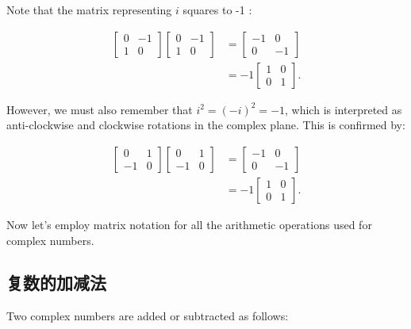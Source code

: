 Note that the matrix representing $i$ squares to -1 :

$$
\begin{aligned}
{\left[\begin{array}{cc}
0 & -1 \\
1 & 0
\end{array}\right]\left[\begin{array}{cc}
0 & -1 \\
1 & 0
\end{array}\right] } & =\left[\begin{array}{cc}
-1 & 0 \\
0 & -1
\end{array}\right] \\
& =-1\left[\begin{array}{ll}
1 & 0 \\
0 & 1
\end{array}\right] .
\end{aligned}
$$

However, we must also remember that $i^{2}=(-i)^{2}=-1$, which is interpreted as anti-clockwise and clockwise rotations in the complex plane. This is confirmed by:

$$
\begin{aligned}
{\left[\begin{array}{cc}
0 & 1 \\
-1 & 0
\end{array}\right]\left[\begin{array}{cc}
0 & 1 \\
-1 & 0
\end{array}\right] } & =\left[\begin{array}{cc}
-1 & 0 \\
0 & -1
\end{array}\right] \\
& =-1\left[\begin{array}{ll}
1 & 0 \\
0 & 1
\end{array}\right] .
\end{aligned}
$$

Now let's employ matrix notation for all the arithmetic operations used for complex numbers.

\subsection{复数的加减法}
Two complex numbers are added or subtracted as follows:

